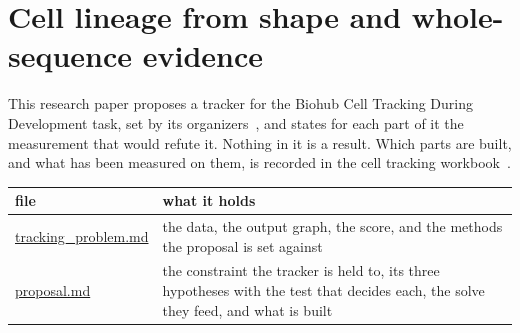 \chapter{\texorpdfstring{Cell lineage from shape and whole-sequence evidence}{Cell lineage from shape and whole-sequence evidence}}
\label{chap:readme}

This research paper proposes a tracker for the Biohub Cell Tracking During Development task, set by its organizers~\cite{src:Biohub-competition}, and states for each part of it the measurement that would refute it. Nothing in it is a result. Which parts are built, and what has been measured on them, is recorded in the cell tracking workbook~\cite{src:Quigg-cell-tracking-workbook}.

{\small
\setlength{\tabcolsep}{6pt}
\begin{longtable}{>{\RaggedRight\arraybackslash}p{}>{\RaggedRight\arraybackslash}p{}}
\toprule
file & what it holds \\
\midrule
\endhead
\hyperref[chap:tracking-problem]{tracking\_\allowbreak{}problem.md} & the data, the output graph, the score, and the methods the proposal is set against \\
\hyperref[chap:proposal]{proposal.md} & the constraint the tracker is held to, its three hypotheses with the test that decides each, the solve they feed, and what is built \\
\bottomrule
\end{longtable}
}
